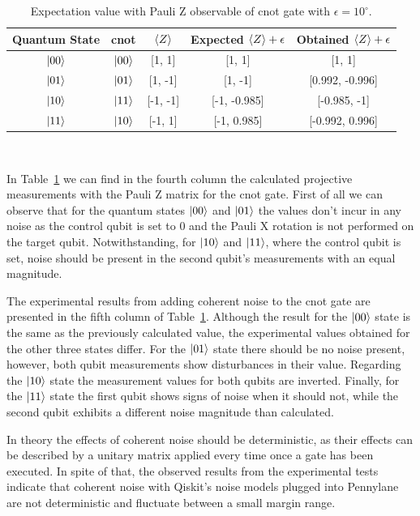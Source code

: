 \begin{table}[h]
  \centering
  \begin{tabular}{|c|c|c|c|c|}
    \hline
    Quantum State & \ac{cnot} & \(\expval{Z}\) & Expected \(\expval{Z}+\epsilon\) & Obtained \(\expval{Z}+\epsilon\) \\
    \hline
    \(\ket{00}\) & \(\ket{00}\) & [1, 1]   & [1, 1]       & [1, 1]          \\
    \hline
    \(\ket{01}\) & \(\ket{01}\) & [1, -1]  & [1, -1]      & [0.992, -0.996] \\
    \hline
    \(\ket{10}\) & \(\ket{11}\) & [-1, -1] & [-1, -0.985] & [-0.985, -1]    \\
    \hline
    \(\ket{11}\) & \(\ket{10}\) & [-1, 1]  & [-1, 0.985]  & [-0.992, 0.996] \\
    \hline
  \end{tabular}
  \caption{Expectation value with Pauli Z observable of \ac{cnot} gate with \(\epsilon = 10^{\circ}\).}\label{tab:cnot_noise}
\end{table} \

In Table~\ref{tab:cnot_noise} we can find in the fourth column the calculated
projective measurements with the Pauli Z matrix for the \ac{cnot} gate.
First of all we can observe that for the quantum states \(\ket{00}\)
and \(\ket{01}\) the values don't incur in any noise as the control
qubit is set to 0 and the Pauli X rotation is not performed on the target
qubit. Notwithstanding, for \(\ket{10}\) and \(\ket{11}\), where the
control qubit is set, noise should be present in the second qubit's
measurements with an equal magnitude. \

The experimental results from adding coherent noise to the
\ac{cnot} gate are presented in the fifth column of Table~\ref{tab:cnot_noise}.
Although the result for the \(\ket{00}\) state is the same as the
previously calculated value, the experimental values obtained for
the other three states differ. For the \(\ket{01}\) state there
should be no noise present, however, both qubit measurements
show disturbances in their value. Regarding the \(\ket{10}\) state
the measurement values for both qubits are inverted. Finally,
for the \(\ket{11}\) state the first qubit shows signs of noise
when it should not, while the second qubit exhibits a different noise
magnitude than calculated. \

In theory the effects of coherent noise should be deterministic,
as their effects can be described by a unitary matrix applied
every time once a gate has been executed. In spite of that,
the observed results from the experimental tests indicate that
coherent noise with Qiskit's noise models plugged into Pennylane
are not deterministic and fluctuate between a small margin range. \


